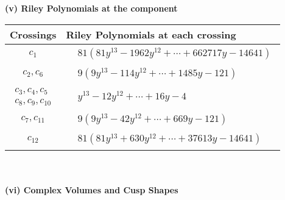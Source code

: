 \documentclass[1p]{elsarticle_modified}
\theoremstyle{definition}
\begin{document}
\newpage\renewcommand{\arraystretch}{1}
\flushleft \textbf{(v) Riley Polynomials at the component}\newline \\
\begin{tabular}{m{50pt}|m{274pt}}
Crossings & \hspace{64pt}Riley Polynomials at each crossing \\
\hline $$\begin{aligned}c_{1}\end{aligned}$$&$\begin{aligned}
&81(81 y^{13}-1962 y^{12}+\cdots+662717 y-14641)
\end{aligned}$\\
\hline $$\begin{aligned}c_{2},c_{6}\end{aligned}$$&$\begin{aligned}
&9(9 y^{13}-114 y^{12}+\cdots+1485 y-121)
\end{aligned}$\\
\hline $$\begin{aligned}c_{3},c_{4},c_{5}\\c_{8},c_{9},c_{10}\end{aligned}$$&$\begin{aligned}
&y^{13}-12 y^{12}+\cdots+16 y-4
\end{aligned}$\\
\hline $$\begin{aligned}c_{7},c_{11}\end{aligned}$$&$\begin{aligned}
&9(9 y^{13}-42 y^{12}+\cdots+669 y-121)
\end{aligned}$\\
\hline $$\begin{aligned}c_{12}\end{aligned}$$&$\begin{aligned}
&81(81 y^{13}+630 y^{12}+\cdots+37613 y-14641)
\end{aligned}$\\
\hline
\end{tabular}\\~\\
\newpage\flushleft \textbf{(vi) Complex Volumes and Cusp Shapes}
\end{document}
